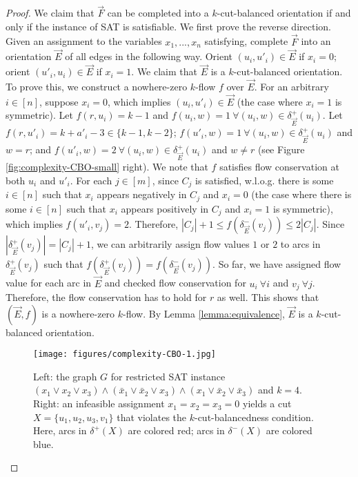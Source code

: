 \documentclass[11pt]{article}
\begin{document}
\begin{proof}
    We claim that $\vec{F}$ can be completed into a $k$-cut-balanced orientation if and only if the instance of SAT is satisfiable. We first prove the reverse direction. Given an assignment to the variables $x_1,...,x_n$ satisfying, complete $\vec{F}$ into an orientation $\vec{E}$ of all edges in the following way. Orient $(u_i,u'_i)\in \vec{E}$ if $x_i=0$;  orient $(u'_i,u_i)\in \vec{E}$ if $x_i=1$. We claim that $\vec{E}$ is a $k$-cut-balanced orientation. To prove this, we construct a nowhere-zero $k$-flow $f$ over $\vec{E}$. For an arbitrary $i\in [n]$, suppose $x_i=0$, which implies $(u_i,u'_i)\in\vec{E}$ (the case where $x_i=1$ is symmetric). Let $f(r,u_i)=k-1$ and $f(u_i,w)=1\ \forall (u_i,w)\in\delta_{\vec{E}}^+(u_i)$. Let $f(r,u'_i)=k+a'_i-3\in\{k-1,k-2\}$; $f(u'_i,w)=1\ \forall (u_i,w)\in\delta_{\vec{E}}^+(u_i)$ and $w=r$; and $f(u'_i,w)=2\ \forall (u_i,w)\in\delta_{\vec{E}}^+(u_i)$ and $w\neq r$ (see Figure \ref{fig:complexity-CBO-small} right). We note that $f$ satisfies flow conservation at both $u_i$ and $u'_i$. For each $j\in [m]$, since $C_j$ is satisfied, w.l.o.g. there is some $i\in[n]$ such that $x_i$ appears negatively in $C_j$ and $x_i=0$ (the case where there is some $i\in[n]$ such that $x_i$ appears positively in $C_j$ and $x_i=1$ is symmetric), which implies $f(u'_i,v_j)=2$. Therefore, $|C_j|+1\leq f(\delta_{\vec{E}}^-(v_j))\leq 2|C_j|$. Since $|\delta_{\vec{E}}^+(v_j)|=|C_j|+1$, we can arbitrarily assign flow values $1$ or $2$ to arcs in $\delta_{\vec{E}}^+(v_j)$ such that $f(\delta_{\vec{E}}^+(v_j))=f(\delta_{\vec{E}}^-(v_j))$. So far, we have assigned flow value for each arc in $\vec{E}$ and checked flow conservation for $u_i\ \forall i$ and $v_j\ \forall j$. Therefore, the flow conservation has to hold for $r$ as well. This shows that $(\vec{E},f)$ is a nowhere-zero $k$-flow. By Lemma \ref{lemma:equivalence}, $\vec{E}$ is a $k$-cut-balanced orientation.
\begin{figure}[htbp]
    \centering
    \texttt{[image: figures/complexity-CBO-1.jpg]}
    \caption{Left: the graph $G$ for restricted SAT instance $(x_1\vee x_2\vee x_3)\wedge (\bar{x}_1\vee \bar{x}_2\vee x_3)\wedge (x_1\vee \bar{x}_2\vee \bar{x}_3)$ and $k=4$. Right: an infeasible assignment $x_1=x_2=x_3=0$ yields a cut $X=\{u_1,u_2,u_3,v_1\}$ that violates the $k$-cut-balancedness condition. Here, arcs in $\delta^+(X)$ are colored red; arcs in $\delta^-(X)$ are colored blue.}
    \label{fig:complexity-CBO-big}
\end{figure}
    

\end{proof}
\end{document}
